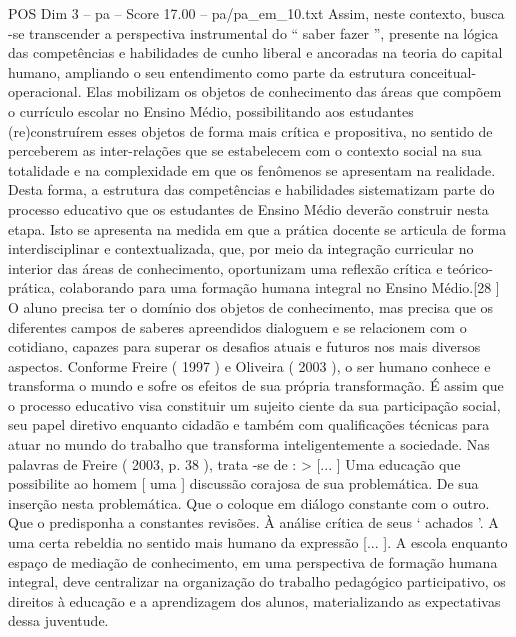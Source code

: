 \begin{textsample}{POS Dim 3 – pa – Score 17.00 – pa/pa\_em\_10.txt}
Assim, neste contexto, busca -se transcender a perspectiva instrumental do “ saber fazer ”, presente na lógica das competências e habilidades de cunho liberal e ancoradas na teoria do capital humano, ampliando o seu entendimento como parte da estrutura conceitual-operacional.
Elas mobilizam os objetos de conhecimento das áreas que compõem o currículo escolar no Ensino Médio, possibilitando aos estudantes (re)construírem esses objetos de forma mais crítica e propositiva, no sentido de perceberem as inter-relações que se estabelecem com o contexto social na sua totalidade e na complexidade em que os fenômenos se apresentam na realidade.
Desta forma, a estrutura das competências e habilidades sistematizam parte do processo educativo que os estudantes de Ensino Médio deverão construir nesta etapa.
Isto se apresenta na medida em que a prática docente se articula de forma interdisciplinar e contextualizada, que, por meio da integração curricular no interior das áreas de conhecimento, oportunizam uma reflexão crítica e teórico-prática, colaborando para uma formação humana integral no Ensino Médio.[28 ] O aluno precisa ter o domínio dos objetos de conhecimento, mas precisa que os diferentes campos de saberes apreendidos dialoguem e se relacionem com o cotidiano, capazes para superar os desafios atuais e futuros nos mais diversos aspectos.
Conforme Freire ( 1997 ) e Oliveira ( 2003 ), o ser humano conhece e transforma o mundo e sofre os efeitos de sua própria transformação.
É assim que o processo educativo visa constituir um sujeito ciente da sua participação social, seu papel diretivo enquanto cidadão e também com qualificações técnicas para atuar no mundo do trabalho que transforma inteligentemente a sociedade.
Nas palavras de Freire ( 2003, p. 38 ), trata -se de : > [... ] Uma educação que possibilite ao homem [ uma ] discussão corajosa de sua problemática.
De sua inserção nesta problemática.
Que o coloque em diálogo constante com o outro.
Que o predisponha a constantes revisões.
À análise crítica de seus ‘ achados ’.
A uma certa rebeldia no sentido mais humano da expressão [... ].
A escola enquanto espaço de mediação de conhecimento, em uma perspectiva de formação humana integral, deve centralizar na organização do trabalho pedagógico participativo, os direitos à educação e a aprendizagem dos alunos, materializando as expectativas dessa juventude.

\end{textsample}
